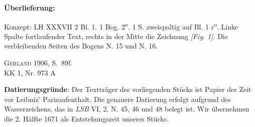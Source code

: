    
        
        \begin{ledgroupsized}[r]{120mm}
        \footnotesize 
        \pstart        
        \noindent\textbf{\"{U}berlieferung:}  
        \pend
        \end{ledgroupsized}
      
       
              \begin{ledgroupsized}[r]{114mm}
              \footnotesize 
              \pstart \parindent -6mm
              Konzept: LH XXXVII 2 Bl. 1. 1 Bog. 2\textsuperscript{o}. 1 S. zweispaltig auf Bl. 1 r\textsuperscript{o}. Linke Spalte fortlaufender Text, rechts in der Mitte die Zeichnung \textit{[Fig. 1]}. Die verbleibenden Seiten des Bogens N. 15 und N. 16.\pend
              \end{ledgroupsized}
       
              \begin{ledgroupsized}[r]{114mm}
              \footnotesize 
              \pstart \parindent -6mm
              \cite{00243}\textsc{Gerland} 1906, S.~89f.\\KK 1, Nr. 973 A\pend
              \end{ledgroupsized}
        \vspace*{5mm}
        \begin{ledgroup}
        \footnotesize 
        \pstart
      \noindent\footnotesize{\textbf{Datierungsgr\"{u}nde}: Der Texttr\"{a}ger des vorliegenden St\"{u}cks ist Papier der Zeit vor Leibniz' Parisaufenthalt. Die genauere Datierung erfolgt aufgrund des Wasserzeichens, das in \textit{LSB} VI, 2, N. 45, 46 und 48 belegt ist. Wir \"{u}bernehmen die 2. H\"{a}lfte 1671 als Entstehungszeit unseres St\"{u}cks.}
        \pend
        \end{ledgroup}
      
